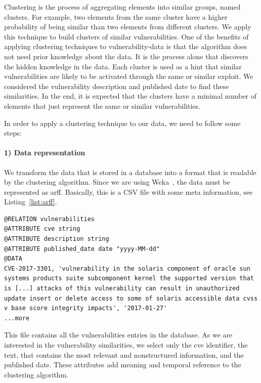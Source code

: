 Clustering is the process of aggregating elements into similar groups, named clusters. 
For example, two elements from the same cluster have a higher probability of being similar than two elements from different clusters. 
We apply this technique to build clusters of similar vulnerabilities.
One of the benefits of applying clustering techniques to vulnerability-data is that the algorithm does not need prior knowledge about the data.
It is the process alone that discovers the hidden knowledge in the data.
Each cluster is used as a hint that similar vulnerabilities are likely to be activated through the same or similar exploit.
We considered the vulnerability description and published date to find these similarities. 
In the end, it is expected that the clusters have a minimal number of elements that just represent the same or similar vulnerabilities.


In order to apply a clustering technique to our data, we need to follow some steps:

\paragraph{1) Data representation}
We transform the data that is stored in a database into a format that is readable by the clustering algorithm. 
Since we are using Weka~\cite{weka}, the data must be represented as \gls{arff}. 
Basically, this is a CSV file with some meta information, see Listing~\ref{list:arff}.

\begin{lstlisting}[style=mystyle,caption=ARFF file describing a vulnerability.,label=list:arff]
@RELATION vulnerabilities
@ATTRIBUTE cve string
@ATTRIBUTE description string
@ATTRIBUTE published_date date "yyyy-MM-dd"
@DATA
CVE-2017-3301, 'vulnerability in the solaris component of oracle sun systems products suite subcomponent kernel the supported version that is [...] attacks of this vulnerability can result in unauthorized update insert or delete access to some of solaris accessible data cvss v base score integrity impacts', '2017-01-27'
...more
\end{lstlisting}


This file contains all the vulnerabilities entries in the database. 
As we are interested in the vulnerability similarities, we select only the \gls{cve} identifier, the text, that contains the most relevant and nonstructured information, and the published date.
These attributes add meaning and temporal reference to the clustering algorithm.


